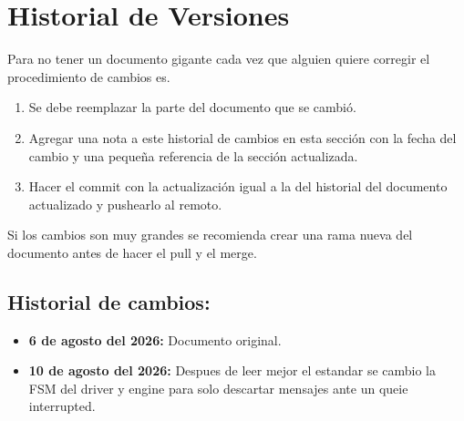 \thispagestyle{plain}
\chapter[Historial de Versiones]{Historial de Versiones}
\label{cp:historialVersiones}

Para no tener un documento gigante cada vez que alguien quiere corregir el procedimiento de cambios es.
\begin{enumerate}
    \item Se debe reemplazar la parte del documento que se cambió.
    \item Agregar una nota a este historial de cambios en esta sección con la fecha del cambio y una pequeña referencia de la sección actualizada.
    \item Hacer el commit con la actualización igual a la del historial del documento actualizado y pushearlo al remoto.
\end{enumerate}
Si los cambios son muy grandes se recomienda crear una rama nueva del documento antes de hacer el pull y el merge.

\section{Historial de cambios:}
\begin{itemize}
    \item \textbf{ 6 de agosto del 2026:} Documento original. 
    \item \textbf{ 10 de agosto del 2026:} Despues de leer mejor el estandar se cambio la FSM del driver y engine para solo descartar mensajes ante un queie interrupted.
\end{itemize}